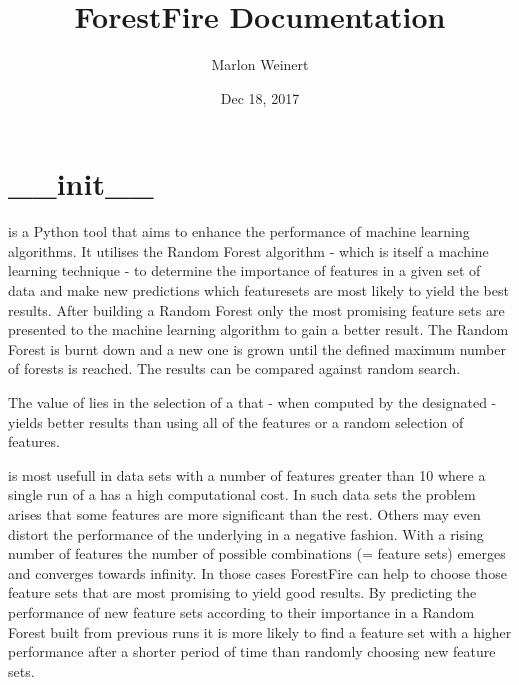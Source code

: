\documentclass[letterpaper,10pt,english]{sphinxmanual}
\title{ForestFire Documentation}
\date{Dec 18, 2017}
\author{Marlon Weinert}
\begin{document}
\maketitle
\sphinxtableofcontents
{}\label{\detokenize{index::doc}}



\chapter{\_\_init\_\_}
\label{\detokenize{index:init}}\label{\detokenize{index:module-ForestFire}}\label{\detokenize{index:forestfire}}
 is a Python tool that aims to enhance the performance of machine learning algorithms. 
It utilises the Random Forest algorithm - which is itself a machine learning technique - to determine the 
importance of features in a given set of data and make new predictions which featuresets are most 
likely to yield the best results. 
After building a Random Forest only the most promising feature sets are presented to the machine learning algorithm to gain a better result. 
The Random Forest is burnt down and a new one is grown until the defined maximum number of forests is reached.
The results can be compared against random search.

The value of  lies in the selection of a {\hyperref[\detokenize{Overview:term-feature-set}]{}} that - when computed by the designated {\hyperref[\detokenize{Overview:mla}]{}} - yields
better results than using all of the features or a random selection of features.

 is most usefull in data sets with a number of features greater than 10 where a single run of
a {\hyperref[\detokenize{Overview:mla}]{}} has a high computational cost. In such data sets the problem arises that some features are
more significant than the rest.
Others may even distort the performance of the underlying {\hyperref[\detokenize{Overview:mla}]{}} in a negative fashion. 
With a rising number of features the number of possible combinations (= feature sets) emerges and converges towards infinity.
In those cases ForestFire can help to choose those feature sets that are most promising to yield good results.
By predicting the performance of new feature sets according to their importance in a Random Forest built 
from previous runs it is more likely to find a feature set with a higher performance after a shorter period 
of time than randomly choosing new feature sets.
\end{document}
